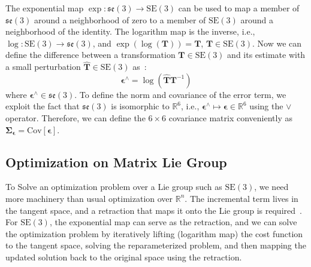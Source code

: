 \documentclass[conference]{IEEEtran}
\newcommand{\SE}{\mathrm{SE}}
\newcommand{\Cov}[1]{\mathrm{Cov}[#1]} %
\begin{document}
The exponential map $\exp:\mathfrak{se}(3) \to \SE(3)$ can be used to map a member of $\mathfrak{se}(3)$ around a neighborhood of zero to a member of $\SE(3)$ around a neighborhood of the identity. The logarithm map is the inverse, i.e., $\log:\SE(3) \to \mathfrak{se}(3)$, and $\exp(\log(\mathbf{T})) = \mathbf{T}$, $\mathbf{T} \in \SE(3)$. Now we can define the difference between a transformation $\mathbf{T} \in \SE(3)$ and its estimate with a small perturbation $\hat{\mathbf{T}} \in \SE(3)$ as~\cite{chirikjian2011stochastic,barfoot2014tro}:
\begin{equation}
 \boldsymbol \epsilon^{\wedge} = \log(\hat{\mathbf{T}} \mathbf{T}^{-1})
\end{equation}
where $\boldsymbol \epsilon^{\wedge} \in \mathfrak{se}(3)$. To define the norm and covariance of the error term, we exploit the fact that $\mathfrak{se}(3)$ is isomorphic to $\mathbb{R}^6$, i.e., $\boldsymbol \epsilon^{\wedge} \mapsto \boldsymbol \epsilon \in \mathbb{R}^6$ using the $\vee$ operator. Therefore, we can define the $6\times 6$ covariance matrix conveniently as $\boldsymbol \Sigma_{\boldsymbol \epsilon} = \Cov{\boldsymbol \epsilon}$.

\subsection{Optimization on Matrix Lie Group}

To Solve an optimization problem over a Lie group such as $\SE(3)$, we need more machinery than usual optimization over $\mathbb{R}^n$. The incremental term lives in the tangent space, and a retraction that maps it onto the Lie group is required~\cite{absil2009optimization}. For $\SE(3)$, the exponential map can serve as the retraction, and we can solve the optimization problem by iteratively lifting (logarithm map) the cost function to the tangent space, solving the reparameterized problem, and then mapping the updated solution back to the original space using the retraction. 
\end{document}
